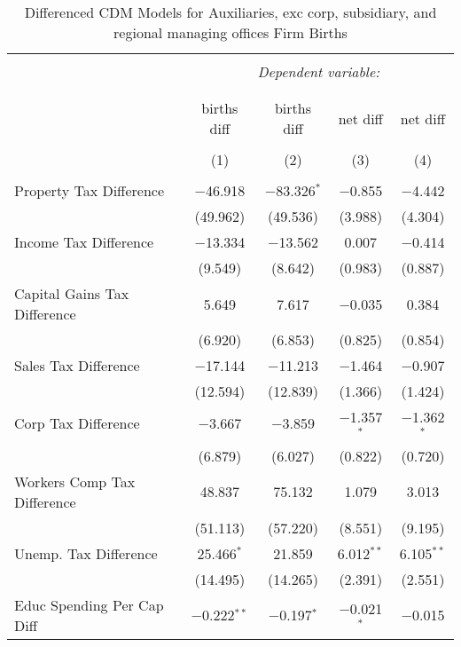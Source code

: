 
\begin{table}[!htbp] \centering 
  \caption{Differenced CDM Models for  Auxiliaries, exc corp, subsidiary, and regional managing offices Firm Births} 
  \label{} 
\begin{tabular}{@{\extracolsep{5pt}}lcccc} 
\\[-1.8ex]\hline 
\hline \\[-1.8ex] 
 & \multicolumn{4}{c}{\textit{Dependent variable:}} \\ 
\cline{2-5} 
\\[-1.8ex] & \multicolumn{4}{c}{ } \\ 
 & births diff & births diff & net diff & net diff \\ 
\\[-1.8ex] & (1) & (2) & (3) & (4)\\ 
\hline \\[-1.8ex] 
 Property Tax Difference & $-$46.918 & $-$83.326$^{*}$ & $-$0.855 & $-$4.442 \\ 
  & (49.962) & (49.536) & (3.988) & (4.304) \\ 
  Income Tax Difference & $-$13.334 & $-$13.562 & 0.007 & $-$0.414 \\ 
  & (9.549) & (8.642) & (0.983) & (0.887) \\ 
  Capital Gains Tax Difference & 5.649 & 7.617 & $-$0.035 & 0.384 \\ 
  & (6.920) & (6.853) & (0.825) & (0.854) \\ 
  Sales Tax Difference & $-$17.144 & $-$11.213 & $-$1.464 & $-$0.907 \\ 
  & (12.594) & (12.839) & (1.366) & (1.424) \\ 
  Corp Tax Difference & $-$3.667 & $-$3.859 & $-$1.357$^{*}$ & $-$1.362$^{*}$ \\ 
  & (6.879) & (6.027) & (0.822) & (0.720) \\ 
  Workers Comp Tax Difference & 48.837 & 75.132 & 1.079 & 3.013 \\ 
  & (51.113) & (57.220) & (8.551) & (9.195) \\ 
  Unemp. Tax Difference & 25.466$^{*}$ & 21.859 & 6.012$^{**}$ & 6.105$^{**}$ \\ 
  & (14.495) & (14.265) & (2.391) & (2.551) \\ 
  Educ Spending Per Cap Diff & $-$0.222$^{**}$ & $-$0.197$^{*}$ & $-$0.021$^{*}$ & $-$0.015 \\ 

\end{tabular}
\end{table}
